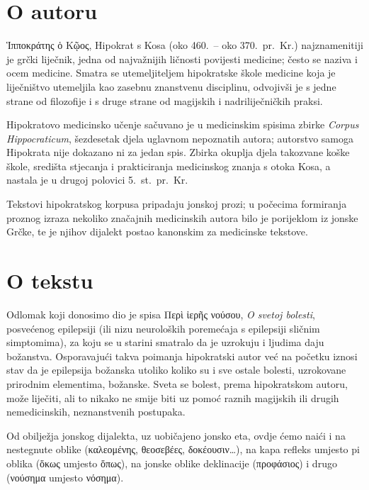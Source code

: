 \section*{O autoru}

Ἱπποκράτης ὁ Κῷος, Hipokrat s Kosa (oko 460.\ – oko 370.\ pr.~Kr.) najznamenitiji je grčki liječnik, jedna od najvažnijih ličnosti povijesti medicine; često se naziva i ocem medicine. Smatra se utemeljiteljem hipokratske škole medicine koja je liječništvo utemeljila kao zasebnu znanstvenu disciplinu, odvojivši je s jedne strane od filozofije i s druge strane od magijskih i nadriliječničkih praksi. 

Hipokratovo medicinsko učenje sačuvano je u medicinskim spisima zbirke \textit{Corpus Hippocraticum}, šezdesetak djela uglavnom nepoznatih autora; autorstvo samoga Hipokrata nije dokazano ni za jedan spis. Zbirka okuplja djela takozvane koške škole, središta stjecanja i prakticiranja medicinskog znanja s otoka Kosa, a nastala je u drugoj polovici 5.~st.\ pr.~Kr.

Tekstovi hipokratskog korpusa pripadaju jonskoj prozi; u počecima formiranja proznog izraza nekoliko značajnih medicinskih autora bilo je porijeklom iz jonske Grčke, te je njihov dijalekt postao kanonskim za medicinske tekstove. 

\section*{O tekstu}

Odlomak koji donosimo dio je spisa \textgreek[variant=ancient]{Περὶ ἱερῆς νούσου,} \textit{O svetoj bolesti}, posvećenog epilepsiji (ili nizu neuroloških poremećaja s epilepsiji sličnim simptomima), za koju se u starini smatralo da je uzrokuju i ljudima daju božanstva. Osporavajući takva poimanja hipokratski autor već na početku iznosi stav da je epilepsija božanska utoliko koliko su i sve ostale bolesti, uzrokovane prirodnim elementima, božanske. Sveta se bolest, prema hipokratskom autoru, može liječiti, ali to nikako ne smije biti uz pomoć raznih magijskih ili drugih nemedicinskih, neznanstvenih postupaka.

Od obilježja jonskog dijalekta, uz uobičajeno jonsko eta, ovdje ćemo naići i na nestegnute oblike \textgreek[variant=ancient]{(καλεομένης, θεοσεβέες, δοκέουσιν\dots),} na kapa refleks umjesto pi oblika \textgreek[variant=ancient]{(ὅκως} umjesto \textgreek[variant=ancient]{ὅπως),} na jonske oblike deklinacije \textgreek[variant=ancient]{(προφάσιος)} i drugo \textgreek[variant=ancient]{(νούσημα} umjesto \textgreek[variant=ancient]{νόσημα).}

